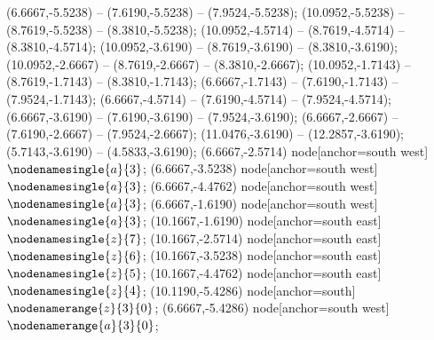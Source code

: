    (6.6667,-5.5238) -- (7.6190,-5.5238) -- (7.9524,-5.5238);
   (10.0952,-5.5238) -- (8.7619,-5.5238) -- (8.3810,-5.5238);
   (10.0952,-4.5714) -- (8.7619,-4.5714) -- (8.3810,-4.5714);
   (10.0952,-3.6190) -- (8.7619,-3.6190) -- (8.3810,-3.6190);
   (10.0952,-2.6667) -- (8.7619,-2.6667) -- (8.3810,-2.6667);
   (10.0952,-1.7143) -- (8.7619,-1.7143) -- (8.3810,-1.7143);
   (6.6667,-1.7143) -- (7.6190,-1.7143) -- (7.9524,-1.7143);
   (6.6667,-4.5714) -- (7.6190,-4.5714) -- (7.9524,-4.5714);
   (6.6667,-3.6190) -- (7.6190,-3.6190) -- (7.9524,-3.6190);
   (6.6667,-2.6667) -- (7.6190,-2.6667) -- (7.9524,-2.6667);
   (11.0476,-3.6190) -- (12.2857,-3.6190);
   (5.7143,-3.6190) -- (4.5833,-3.6190);
   (6.6667,-2.5714) node[anchor=south west] {$\nodenamesingle{a}{3}$};
   (6.6667,-3.5238) node[anchor=south west] {$\nodenamesingle{a}{3}$};
   (6.6667,-4.4762) node[anchor=south west] {$\nodenamesingle{a}{3}$};
   (6.6667,-1.6190) node[anchor=south west] {$\nodenamesingle{a}{3}$};
   (10.1667,-1.6190) node[anchor=south east] {$\nodenamesingle{z}{7}$};
   (10.1667,-2.5714) node[anchor=south east] {$\nodenamesingle{z}{6}$};
   (10.1667,-3.5238) node[anchor=south east] {$\nodenamesingle{z}{5}$};
   (10.1667,-4.4762) node[anchor=south east] {$\nodenamesingle{z}{4}$};
   (10.1190,-5.4286) node[anchor=south] {$\nodenamerange{z}{3}{0}$};
   (6.6667,-5.4286) node[anchor=south west] {$\nodenamerange{a}{3}{0}$};
